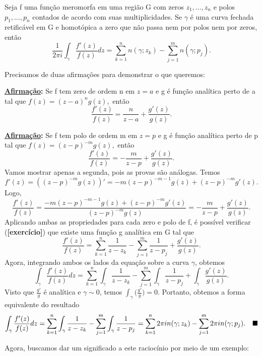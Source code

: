 \documentclass[ComplexAnalysis/complex.tex]{subfiles}
\begin{document}
\hypertarget{argument-principle}{\begin{theorem*}
		Seja f uma função meromorfa em uma região G com zeros \(z_{1},\dotsc ,z_{n}\) e polos \(p_{1},\dotsc , p_{n} \) contados
		de acordo com suas multiplicidades. Se \(\gamma \) é uma curva fechada retificável em G e homotópica a zero que não passa nem por polos
		nem por zeros, então
		\[
			\frac{1}{2\pi i}\int_{\gamma }^{}\frac{f'(z)}{f(z)}dz = \sum\limits_{k=1}^{n}n(\gamma ; z_{k}) - \sum\limits_{j=1}^{m}n(\gamma ; p_{j}).
		\]
	\end{theorem*}}
\begin{proof*}
	Precisamos de duas afirmações para demonstrar o que queremos:

	\textbf{\underline{Afirmação}:} Se f tem zero de ordem n em \(z=a\) e g é função analítica perto de a tal que \(f(z) = (z-a)^{n}g(z),\) então
	\[
		\frac{f'(z)}{f(z)} = \frac{n}{z-a} + \frac{g'(z)}{g(z)}.
	\]

	\textbf{\underline{Afirmação}:} Se f tem polo de ordem m em \(z=p\) e g é função analítica perto de p tal que \(f(z) = (z-p)^{-m}g(z),\) então
	\[
		\frac{f'(z)}{f(z)} = -\frac{m}{z-p} + \frac{g'(z)}{g(z)}.
	\]
	Vamos mostrar apenas a segunda, pois as provas são análogas. Temos
	\[
		f'(z) = ((z-p)^{-m}g(z))' = -m(z-p)^{-m-1}g(z) + (z-p)^{-m}g'(z).
	\]
	Logo,
	\[
		\frac{f'(z)}{f(z)} = \frac{-m(z-p)^{-m-1}g(z) + (z-p)^{-m}g'(z)}{(z-p)^{-m}g(z)} = -\frac{m}{z-p} + \frac{g'(z)}{g(z)}.
	\]
	Aplicando ambas as propriedades para cada zero e polo de f, é possível verificar (\textbf{[exercício]}) que existe uma função g analítica em G tal que
	\[
		\frac{f'(z)}{f(z)} = \sum\limits_{k=1}^{n}\frac{1}{z-z_{k}} - \sum\limits_{j=1}^{m}\frac{1}{z-p_{j}} + \frac{g'(z)}{g(z)}.
	\]
	Agora, integrando ambos os lados da equação sobre a curva \(\gamma \), obtemos
	\[
		\int_{\gamma }^{}\frac{f'(z)}{f(z)}dz = \sum\limits_{k=1}^{n}\int_{\gamma }^{}\frac{1}{z-z_{k}} - \sum\limits_{j=1}^{m}\int_{\gamma }^{}\frac{1}{z-p_{j}} + \int_{\gamma }^{}\frac{g'(z)}{g(z)}.
	\]
	Visto que \(\frac{g'}{g}\) é analítica e \(\gamma \sim 0\), temos \(\int_{\gamma }^{}\biggl(\frac{g'}{g}\biggr) = 0\). Portanto, obtemos a forma equivalente do resultado
	\[
		\int_{\gamma }^{}\frac{f'(z)}{f(z)}dz = \sum\limits_{k=1}^{n}\int_{\gamma }^{}\frac{1}{z-z_{k}} - \sum\limits_{j=1}^{m}\int_{\gamma }^{}\frac{1}{z-p_{j}} = \sum\limits_{k=1}^{n}2\pi i n(\gamma ; z_{k}) - \sum\limits_{j=1}^{m}2\pi i n(\gamma ; p_{j}).\quad \text{$\blacksquare$}
	\]
\end{proof*}
Agora, buscamos dar um significado a este raciocínio por meio de um exemplo:
\end{document}

